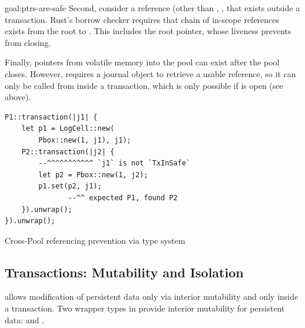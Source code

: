 \begin{goaltrue}{goal:ptrs-are-safe}
Second, consider a reference (other than , , that exists
outside a transaction.  Rust's borrow checker requires that chain of in-scope
references exists from the root to .  This includes the root pointer,
whose liveness prevents  from closing.

Finally,  pointers from volatile memory into the pool can exist
after the pool closes.  However,  requires a journal
object to retrieve a usable reference, so it can only be called from inside a
transaction, which is only possible if  is open (see above).


\begin{lstfloat}
\begin{lstlisting}
P1::transaction(|j1| {
    let p1 = LogCell::new(
        Pbox::new(1, j1), j1);
    P2::transaction(|j2| {
        --^^^^^^^^^^^ `j1` is not `TxInSafe`
        let p2 = Pbox::new(1, j2);
        p1.set(p2, j1);
               --^^ expected P1, found P2
    }).unwrap();
}).unwrap();
\end{lstlisting}
\caption{Cross-Pool referencing prevention via type system}
\label{lst:cross}
\end{lstfloat}
\end{goaltrue}
  
\subsection{Transactions: Mutability and Isolation}

\This{} allows modification of persistent data only via interior mutability
and only inside a transaction.
Two wrapper types in  provide interior mutability for persistent data:
 and .%

